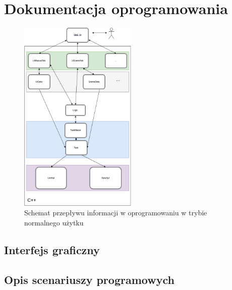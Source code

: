 \documentclass[12pt, eng, twoside, openany, final]{mgr}
\begin{document}
            \section{Dokumentacja oprogramowania}
                \begin{figure}[H]
                \begin{center}
                    \includegraphics[width=0.5\textwidth]{inz_diag.png}
                    \caption{Schemat przepływu informacji w oprogramowaniu w trybie normalnego użytku}
                \end{center}
                \end{figure}
                \newpage
                
                \subsection{Interfejs graficzny}
                \subsection{}
                \newpage
                
                \subsection{Opis scenariuszy programowych}
\end{document}
